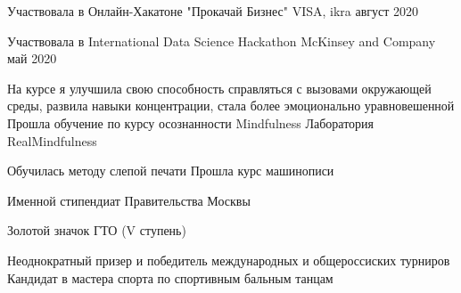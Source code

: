 \documentclass[]{awesome-cv}
\begin{document}
\begin{cventries}
	\cventry
	{}
	{Участвовала в Онлайн-Хакатоне "Прокачай Бизнес"}
	{VISA, ikra}
	{август 2020}
	{}
	\end{cventries}  \vspace{-5mm} \begin{cventries}
	\cventry	
	{}
	{Участвовала в International Data Science Hackathon}
	{McKinsey and Company}
	{май 2020}
	{}
		\end{cventries}  \vspace{-5mm}


\begin{cventries}
	\cventry
	{\qquad \bullet На курсе я улучшила свою способность справляться с вызовами окружающей среды, развила навыки концентрации, стала более эмоционально уравновешенной}
	{Прошла обучение по курсу осознанности Mindfulness }
	{Лаборатория RealMindfulness}
	{}
	{}
	\end{cventries}  \vspace{-7mm} \begin{cventries}
	\cventry	
	{\qquad \bullet Обучилась методу слепой печати}
	{Прошла курс машинописи}
	{}
	{}
	{}
		\end{cventries}  \vspace{-7mm}\begin{cventries}
	\cventry 
	{}
	{Именной стипендиат Правительства Москвы}
	{}{}{}
		\end{cventries}  \vspace{-11mm} \begin{cventries}
	\cventry	
	{}
	{Золотой значок ГТО (V ступень)}
	{}
	{}
	{}
		\end{cventries}  \vspace{-11mm} \begin{cventries}
	\cventry
	{\qquad Неоднократный призер и победитель международных и общероссиских турниров}
	{Кандидат в мастера спорта по спортивным бальным танцам}
	{}
	{}
	{}
	\end{cventries} \vspace{-10mm}
\end{document}

